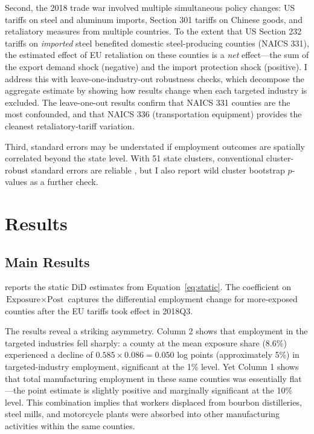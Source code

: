 \documentclass[12pt]{article}
\begin{document}
Second, the 2018 trade war involved multiple simultaneous policy changes: US tariffs on steel and aluminum imports, Section 301 tariffs on Chinese goods, and retaliatory measures from multiple countries. To the extent that US Section 232 tariffs on \textit{imported} steel benefited domestic steel-producing counties (NAICS 331), the estimated effect of EU retaliation on these counties is a \textit{net} effect---the sum of the export demand shock (negative) and the import protection shock (positive). I address this with leave-one-industry-out robustness checks, which decompose the aggregate estimate by showing how results change when each targeted industry is excluded. The leave-one-out results confirm that NAICS 331 counties are the most confounded, and that NAICS 336 (transportation equipment) provides the cleanest retaliatory-tariff variation.

Third, standard errors may be understated if employment outcomes are spatially correlated beyond the state level. With 51 state clusters, conventional cluster-robust standard errors are reliable \citep{abadie2023should}, but I also report wild cluster bootstrap $p$-values as a further check.


\section{Results}

\subsection{Main Results}

 reports the static DiD estimates from Equation~\ref{eq:static}. The coefficient on $\text{Exposure} \times \text{Post}$ captures the differential employment change for more-exposed counties after the EU tariffs took effect in 2018Q3.

The results reveal a striking asymmetry. Column 2 shows that employment in the targeted industries fell sharply: a county at the mean exposure share ($8.6\%$) experienced a decline of $0.585 \times 0.086 = 0.050$ log points (approximately 5\%) in targeted-industry employment, significant at the 1\% level. Yet Column 1 shows that total manufacturing employment in these same counties was essentially flat---the point estimate is slightly positive and marginally significant at the 10\% level. This combination implies that workers displaced from bourbon distilleries, steel mills, and motorcycle plants were absorbed into other manufacturing activities within the same counties.
\end{document}
